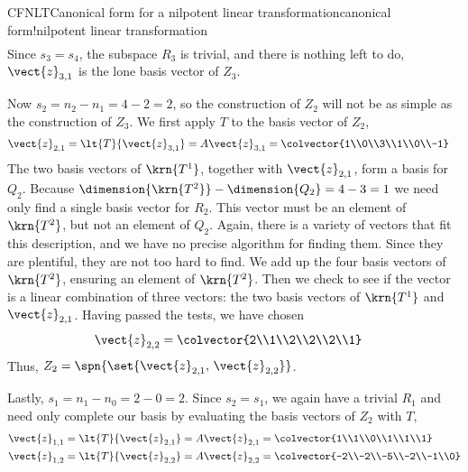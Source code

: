 \begin{example}{CFNLT}{Canonical form for a nilpotent linear transformation}{canonical form!nilpotent linear transformation}
\begin{align*}
\end{align*}
%
Since $s_3=s_4$, the subspace $R_3$ is trivial, and there is nothing left to do, $\vect{z}_{3,1}$ is the lone basis vector of $Z_3$.\par
%
Now $s_2=n_2-n_1=4-2=2$, so the construction of $Z_2$ will not be as simple as the construction of $Z_3$.  We first apply $T$ to the basis vector of $Z_2$,
%
\begin{align*}
\vect{z}_{2,1}&=\lt{T}{\vect{z}_{3,1}}=A\vect{z}_{3,1}=\colvector{1\\0\\3\\1\\0\\-1}
\end{align*}
%
The two basis vectors of $\krn{T^1}$, together with $\vect{z}_{2,1}$, form a basis for $Q_2$.  Because $\dimension{\krn{T^2}}-\dimension{Q_2}=4-3=1$ we need only find a single basis vector for $R_2$.  This vector must be an element of $\krn{T^2}$, but not an element of $Q_2$.  Again, there is a variety of vectors that fit this description, and we have no precise algorithm for finding them.  Since they are plentiful, they are not too hard to find.  We add up the four basis vectors of $\krn{T^2}$, ensuring an element of $\krn{T^2}$.  Then we check to see if the vector is a linear combination of three vectors:  the two basis vectors of $\krn{T^1}$ and $\vect{z}_{2,1}$.  Having passed the tests, we have chosen
%
\begin{align*}
\vect{z}_{2,2}&=\colvector{2\\1\\2\\2\\2\\1}
\end{align*}
%
Thus, $Z_2=\spn{\set{\vect{z}_{2,1},\,\vect{z}_{2,2}}}$.\par
%
Lastly, $s_1=n_1-n_0=2-0=2$.  Since $s_2=s_1$, we again have a trivial $R_1$ and need only complete our basis by evaluating the basis vectors of $Z_2$ with $T$,
%
\begin{align*}
\vect{z}_{1,1}&=\lt{T}{\vect{z}_{2,1}}=A\vect{z}_{2,1}=\colvector{1\\1\\0\\1\\1\\1}\\
\vect{z}_{1,2}&=\lt{T}{\vect{z}_{2,2}}=A\vect{z}_{2,2}=\colvector{-2\\-2\\-5\\-2\\-1\\0}\\

\end{align*}
\end{example}
